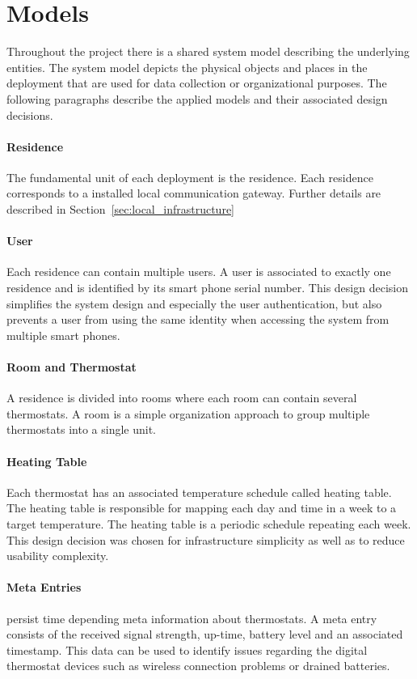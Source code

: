 \section{Models}
\label{sec:system_overview_models}

Throughout the project there is a shared system model describing the underlying entities. The system model depicts the physical objects and places in the deployment that are used for data collection or organizational purposes. The following paragraphs describe the applied models and their associated design decisions.

\paragraph{Residence}

The fundamental unit of each deployment is the residence. Each residence corresponds to a installed local communication gateway. Further details are described in Section~\ref{sec:local_infrastructure}

\paragraph{User}

Each residence can contain multiple users. A user is associated to exactly one residence and is identified by its smart phone serial number. This design decision simplifies the system design and especially the user authentication, but also prevents a user from using the same identity when accessing the system from multiple smart phones.

\paragraph{Room and Thermostat}
A residence is divided into rooms where each room can contain several thermostats. A room is a simple organization approach to group multiple thermostats into a single unit.

\paragraph{Heating Table}

Each thermostat has an associated temperature schedule called heating table. The heating table is responsible for mapping each day and time in a week to a target temperature. The heating table is a periodic schedule repeating each week. This design decision was chosen for infrastructure simplicity as well as to reduce usability complexity.

\paragraph{Meta Entries}

persist time depending meta information about thermostats. A meta entry consists of the received signal strength, up-time, battery level and an associated timestamp. This data can be used to identify issues regarding the digital thermostat devices such as wireless connection problems or drained batteries.